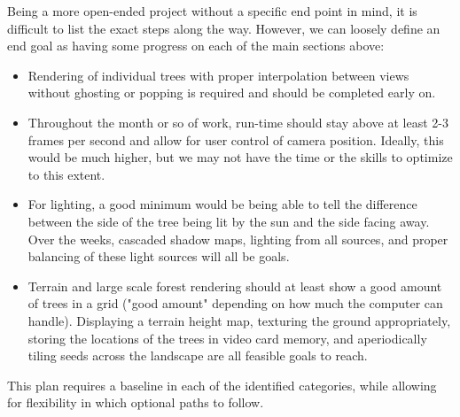 \documentclass{article}
\begin{document}
Being a more open-ended project without a specific end point in mind, it is difficult to list the exact steps along the way. However, we can loosely define an end goal as having some progress on each of the main sections above:

\begin {itemize}
\item Rendering of individual trees with proper interpolation between views without ghosting or popping is required and should be completed early on.

\item Throughout the month or so of work, run-time should stay above at least 2-3 frames per second and allow for user control of camera position. Ideally, this would be much higher, but we may not have the time or the skills to optimize to this extent.

\item For lighting, a good minimum would be being able to tell the difference between the side of the tree being lit by the sun and the side facing away. Over the weeks, cascaded shadow maps, lighting from all sources, and proper balancing of these light sources will all be goals.

\item Terrain and large scale forest rendering should at least show a good amount of trees in a grid ("good amount" depending on how much the computer can handle). Displaying a terrain height map, texturing the ground appropriately, storing the locations of the trees in video card memory, and aperiodically tiling seeds across the landscape are all feasible goals to reach.

\end {itemize}

This plan requires a baseline in each of the identified categories, while allowing for flexibility in which optional paths to follow.
\end{document}
